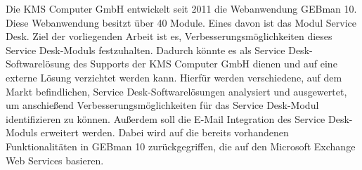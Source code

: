 \documentclass[fontsize=12pt]{scrartcl}
\begin{document}
\noindent
Die KMS Computer GmbH entwickelt seit 2011 die Webanwendung GEBman 10. Diese Webanwendung besitzt über 40 Module. Eines davon ist das Modul Service Desk. Ziel der vorliegenden Arbeit ist es, Verbesserungsmöglichkeiten dieses Service Desk-Moduls festzuhalten. Dadurch könnte es als Service Desk-Softwarelösung des Supports der KMS Computer GmbH dienen und auf eine externe Lösung verzichtet werden kann. Hierfür werden verschiedene, auf dem Markt befindlichen, Service Desk-Softwarelösungen analysiert und ausgewertet, um anschießend Verbesserungsmöglichkeiten für das Service Desk-Modul identifizieren zu können.\newline
Außerdem soll die E-Mail Integration des Service Desk-Moduls erweitert werden. Dabei wird auf die bereits vorhandenen Funktionalitäten in GEBman 10 zurückgegriffen, die auf den Microsoft Exchange Web Services basieren.

\newpage

\vspace*{-1cm}
\setcounter{page}{4}
\tableofcontents
\newpage

\vspace*{-1cm}
\begin{spacing}{1.8}
\listoffigures
\end{spacing}
\newpage
\end{document}
